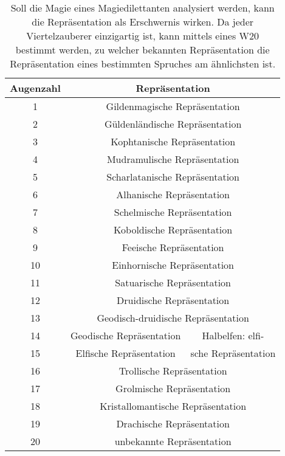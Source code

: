 \begin{table}
	\centering
	\caption[Repräsentationsähnlichkeit übernatürlicher Begabung mit 1W20 festlegen]{Soll die Magie eines Magiedilettanten analysiert werden, kann die Repräsentation als Erschwernis wirken. Da jeder Viertelzauberer einzigartig ist, kann mittels eines W20 bestimmt werden, zu welcher bekannten Repräsentation die Repräsentation eines bestimmten Spruches am ähnlichsten ist.\label{rep-ueg-w20}}
	\begin{tabular}{cc|c}
		\toprule
		Augenzahl & \multicolumn{2}{c}{Repräsentation} \\
		\hline
		1 & \multicolumn{2}{c}{Gildenmagische Repräsentation} \\
		2 & \multicolumn{2}{c}{Güldenländische Repräsentation} \\
		3 & \multicolumn{2}{c}{Kophtanische Repräsentation} \\
		4 & \multicolumn{2}{c}{Mudramulische Repräsentation} \\
		5 & \multicolumn{2}{c}{Scharlatanische Repräsentation} \\
		6 & \multicolumn{2}{c}{Alhanische Repräsentation} \\
		7 & \multicolumn{2}{c}{Schelmische Repräsentation} \\
		8 & \multicolumn{2}{c}{Koboldische Repräsentation} \\
		9 & \multicolumn{2}{c}{Feeische Repräsentation} \\
		10 & \multicolumn{2}{c}{Einhornische Repräsentation} \\
		11 & \multicolumn{2}{c}{Satuarische Repräsentation} \\
		12 & \multicolumn{2}{c}{Druidische Repräsentation} \\
		13 & \multicolumn{2}{c}{Geodisch-druidische Repräsentation} \\
		14 & Geodische Repräsentation & Halbelfen: elfi- \\
		15 & Elfische Repräsentation & sche Repräsentation  \\
		16 & \multicolumn{2}{c}{Trollische Repräsentation} \\
		17 & \multicolumn{2}{c}{Grolmische Repräsentation} \\
		18 & \multicolumn{2}{c}{Kristallomantische Repräsentation} \\
		19 & \multicolumn{2}{c}{Drachische Repräsentation} \\
		20 & \multicolumn{2}{c}{unbekannte Repräsentation} \\
		\bottomrule
	\end{tabular}
\end{table}

